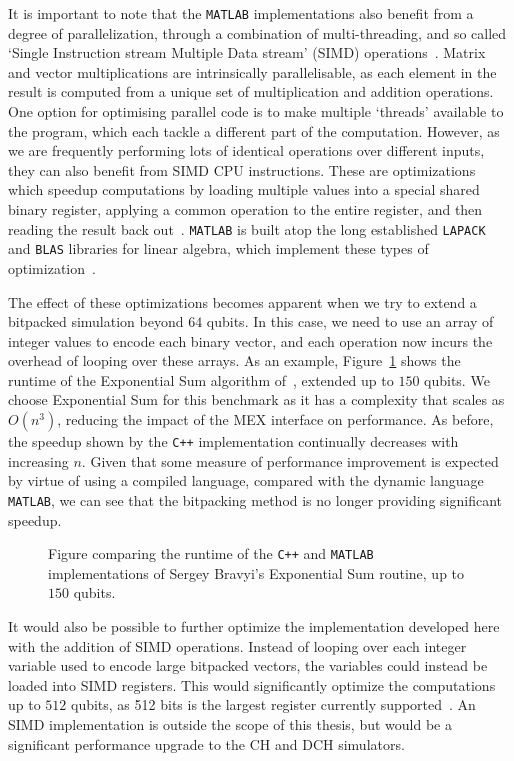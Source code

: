 It is important to note that the \texttt{MATLAB} implementations also benefit from a degree of parallelization, through a combination of multi-threading, and so called `Single Instruction stream Multiple Data stream' (SIMD) operations~\cite{Flynn1972}. Matrix and vector multiplications are intrinsically parallelisable, as each element in the result is computed from a unique set of multiplication and addition operations. One option for optimising parallel code is to make multiple `threads' available to the program, which each tackle a different part of the computation. However, as we are frequently performing lots of identical operations over different inputs, they can also benefit from SIMD CPU instructions. These are optimizations which speedup computations by loading multiple values into a special shared binary register, applying a common operation to the entire register, and then reading the result back out~\cite{SIMD}. \texttt{MATLAB} is built atop the long established \texttt{LAPACK} and \texttt{BLAS} libraries for linear algebra, which implement these types of optimization~\cite{MATLABTech,LAPACK,BLAS}.\par
The effect of these optimizations becomes apparent when we try to extend a bitpacked simulation beyond $64$ qubits. In this case, we need to use an array of integer values to encode each binary vector, and each operation now incurs the overhead of looping over these arrays. As an example, Figure~\ref{fig:big_sum} shows the runtime of the Exponential Sum algorithm of~\cite{Bravyi2018}, extended up to $150$ qubits. We choose Exponential Sum for this benchmark as it has a complexity that scales as $O(n^{3})$, reducing the impact of the MEX interface on performance. As before, the speedup shown by the \texttt{C++} implementation continually decreases with increasing $n$. Given that some measure of performance improvement is expected by virtue of using a compiled language, compared with the dynamic language \texttt{MATLAB}, we can see that the bitpacking method is no longer providing significant speedup.
\par
\begin{figure}[t]
    \centering
    \begin{scaletikzpicturetowidth}{0.8\textwidth}
        
    \end{scaletikzpicturetowidth}
    \caption{Figure comparing the runtime of the \texttt{C++} and \texttt{MATLAB} implementations of Sergey Bravyi's Exponential Sum routine, up to $150$ qubits.}
    \label{fig:big_sum}
\end{figure}
It would also be possible to further optimize the implementation developed here with the addition of SIMD operations. Instead of looping over each integer variable used to encode large bitpacked vectors, the variables could instead be loaded into SIMD registers. This would significantly optimize the computations up to $512$ qubits, as 512 bits is the largest register currently supported~\cite{SIMD}. An SIMD implementation is outside the scope of this thesis, but would be a significant performance upgrade to the CH and DCH simulators.
